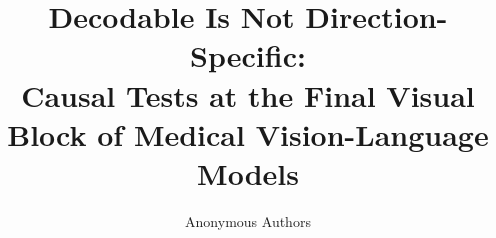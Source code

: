 \documentclass{article}
\title{Decodable Is Not Direction-Specific:\\
Causal Tests at the Final Visual Block of Medical Vision-Language Models}
\author{Anonymous Authors}
\begin{document}
\maketitle

\begin{abstract}

\end{abstract}











\appendix

\end{document}
